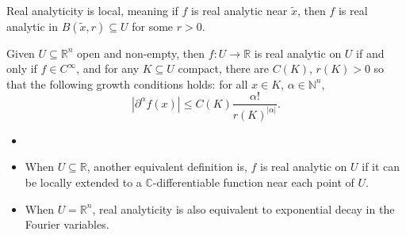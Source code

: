 \documentclass[12pt]{article}
\begin{document}
Real analyticity is local, meaning if $f$ is real analytic near $\tilde x$, then $f$ is real analytic in $B(\tilde x, r) \subseteq U$ for some $r > 0$.

\begin{proposition}
	Given $U \subseteq \mathbb{R}^n$ open and non-empty, then $f : U \to \mathbb{R}$ is real analytic on $U$ if and only if $f \in C^\infty$, and for any $K \subseteq U$ compact, there are $C(K)$, $r(K) > 0$ so that the following growth conditions holds: for all $x \in K$, $\alpha \in \mathbb{N}^n$,
	\[
	|\partial^\alpha f(x)| \leq C(K) \frac{\alpha!}{r(K)^{|\alpha|}}.
	\]
\end{proposition}

\begin{remark}
	\begin{itemize}
		\item[]
	\item When $U \subseteq \mathbb{R}$, another equivalent definition is, $f$ is real analytic on $U$ if it can be locally extended to a $\mathbb{C}$-differentiable function near each point of $U$.
	\item When $U = \mathbb{R}^n$, real analyticity is also equivalent to exponential decay in the Fourier variables.
	\end{itemize}
\end{remark}

\end{document}

